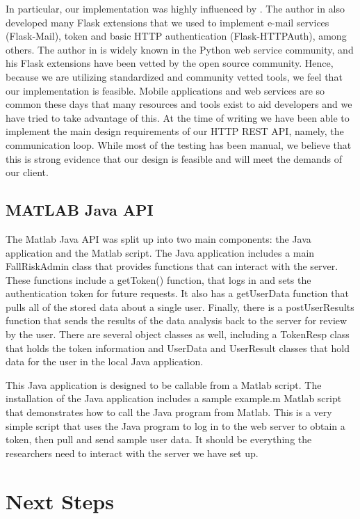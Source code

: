 \documentclass[conference]{IEEEtran}
\begin{document}
In particular, our implementation was highly influenced by \cite{grinberg2018new}. The author in \cite{grinberg2018new} also developed many Flask extensions that we used to implement e-mail services (Flask-Mail), token and basic HTTP authentication (Flask-HTTPAuth), among others. The author in \cite{grinberg2018new} is widely known in the Python web service community, and his Flask extensions have been vetted by the open source community. Hence, because we are utilizing standardized and community vetted tools, we feel that our implementation is feasible. Mobile applications and web services are so common these days that many resources and tools exist to aid developers and we have tried to take advantage of this. At the time of writing we have been able to implement the main design requirements of our HTTP REST API, namely, the communication loop. While most of the testing has been manual, we believe that this is strong evidence that our design is feasible and will meet the demands of our client.

\subsection{MATLAB Java API}

The Matlab Java API was split up into two main components: the Java application and the Matlab script. The Java application includes a main FallRiskAdmin class that provides functions that can interact with the server. These functions include a getToken() function, that logs in and sets the authentication token for future requests. It also has a getUserData function that pulls all of the stored data about a single user. Finally, there is a postUserResults function that sends the results of the data analysis back to the server for review by the user. There are several object classes as well, including a TokenResp class that holds the token information and UserData and UserResult classes that hold data for the user in the local Java application.

This Java application is designed to be callable from a Matlab script. The installation of the Java application includes a sample example.m Matlab script that demonstrates how to call the Java program from Matlab. This is a very simple script that uses the Java program to log in to the web server to obtain a token, then pull and send sample user data. It should be everything the researchers need to interact with the server we have set up. 

\section{Next Steps}
\end{document}
